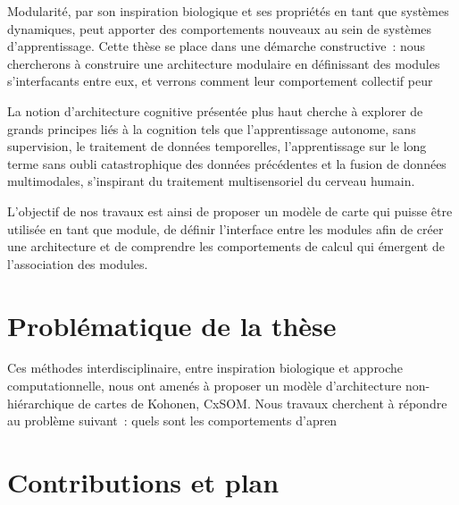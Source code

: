 Modularité, par son inspiration biologique et ses propriétés en tant que systèmes dynamiques, peut apporter des comportements nouveaux au sein de systèmes d'apprentissage.
Cette thèse se place dans une démarche constructive~: nous chercherons à construire une architecture modulaire en définissant des modules s'interfacants entre eux, et verrons comment leur comportement collectif peur 

La notion d'architecture cognitive présentée plus haut cherche à explorer de grands principes liés à la cognition tels que l'apprentissage autonome, sans supervision, le traitement de données temporelles, l'apprentissage sur le long terme sans oubli catastrophique des données précédentes et la fusion de données multimodales, s'inspirant du traitement multisensoriel du cerveau humain.

L'objectif de nos travaux est ainsi de proposer un modèle de carte qui puisse être utilisée en tant que module, de définir l'interface entre les modules afin de créer une architecture et de comprendre les comportements de calcul qui émergent de l'association des modules. 

\section*{Problématique de la thèse}

Ces méthodes interdisciplinaire, entre inspiration biologique et approche computationnelle, nous ont amenés à proposer un modèle d'architecture non-hiérarchique de cartes de Kohonen, CxSOM. Nous travaux cherchent à répondre au problème suivant~: quels sont les comportements d'apren

\section*{Contributions et plan}


